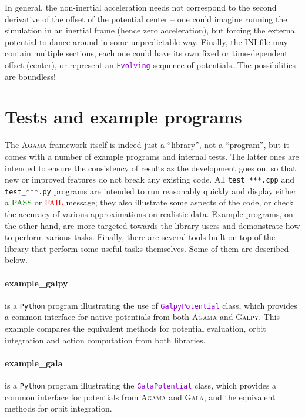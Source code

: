 \documentclass[12pt]{article}
\newcommand{\Agama}{\textsc{Agama}\xspace}
\newcommand{\Galpy}{\textsc{Galpy}\xspace}
\newcommand{\Gala} {\textsc{Gala}\xspace}
\newcommand{\Python}{\texttt{Python}\xspace}
\newcommand{\ttt}[1]{\textcolor{darkviolet}{\texttt{#1}}}
\begin{document}
In general, the non-inertial acceleration needs not correspond to the second derivative of the offset of the potential center -- one could imagine running the simulation in an inertial frame (hence zero acceleration), but forcing the external potential to dance around in some unpredictable way. Finally, the INI file may contain multiple sections, each one could have its own fixed or time-dependent offset (center), or represent an \ttt{Evolving} sequence of potentials\dots The possibilities are boundless!


\section{Tests and example programs}  \label{sec:ExamplesTests}

The \Agama framework itself is indeed just a ``library'', not a ``program'', but it comes with a number of example programs and internal tests. The latter ones are intended to ensure the consistency of results as the development goes on, so that new or improved features do not break any existing code. All \texttt{test_***.cpp} and \texttt{test_***.py} programs are intended to run reasonably quickly and display either a \textcolor{Green}{PASS} or \textcolor{Red}{FAIL} message; they also illustrate some aspects of the code, or check the accuracy of various approximations on realistic data. Example programs, on the other hand, are more targeted towards the library users and demonstrate how to perform various tasks. Finally, there are several tools built on top of the library that perform some useful tasks themselves. Some of them are described below.

\paragraph{example_galpy} is a \Python program illustrating the use of \ttt{GalpyPotential} class, which provides a common interface for native potentials from both \Agama and \Galpy. This example compares the equivalent methods for potential evaluation, orbit integration and action computation from both libraries.

\paragraph{example_gala} is a \Python program illustrating the \ttt{GalaPotential} class, which provides a common interface for potentials from \Agama and \Gala, and the equivalent methods for orbit integration.
\end{document}
